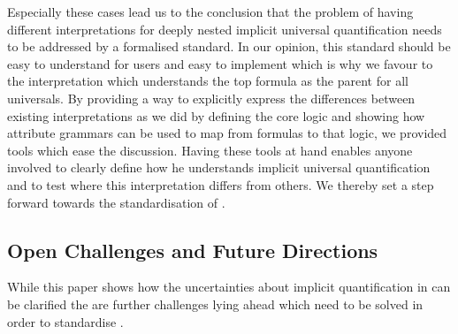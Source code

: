 Especially these cases lead us to the conclusion that the problem of having different interpretations for deeply nested implicit universal quantification needs 
to be addressed by a formalised standard. 
In our opinion, this standard should be easy to understand for users and easy to implement which is why we favour to
the interpretation which understands the top formula as the parent for all universals. 
By providing a way to explicitly express 
the differences between existing interpretations as we did by defining the core logic and showing how attribute grammars can be used to map from
\nthree formulas to that logic, we provided tools which ease the discussion.
Having these tools at hand enables anyone involved to clearly define how he understands implicit universal quantification 
and to test where this interpretation differs
from others. We thereby set a step forward towards the standardisation of \nthree.

\subsection{Open Challenges and Future Directions} 
While this paper shows how the uncertainties about implicit quantification in \nthree can be clarified the are further challenges lying ahead  
which need to be solved in order to standardise \nthreelogic. 

